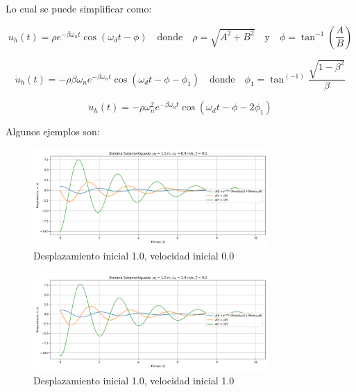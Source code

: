 \documentclass{article}  %
\begin{document}
Lo cual se puede simplificar como:

\begin{equation}
    u_h(t) = \rho e^{-\beta \omega_n t} \cos(\omega_d t - \phi) \quad \text{donde} \quad \rho = \sqrt{A^2 + B^2} \quad \text{y} \quad \phi = \tan^{-1}(\frac{A}{B})
\end{equation}

\begin{equation}
    \dot{u}_h(t) = -\rho \beta \omega_n e^{-\beta \omega_n t} \cos(\omega_d t - \phi -\phi_1) \quad \text{donde} \quad \phi_1 = \tan^(-1)\frac{\sqrt{1-\beta^2}}{\beta}
\end{equation}

\begin{equation}
    \ddot{u}_h(t) = -\rho \omega_n^2 e^{-\beta \omega_n t} \cos(\omega_d t - \phi - 2\phi_1)
\end{equation}

Algunos ejemplos son:

\begin{figure}[H]
    \centering
    \includegraphics[width=0.8\textwidth]{GRAFICOS/sis_subamortiguado_u0_1.0_v0_0.0_zeta_0.1.png}
    \caption{Desplazamiento inicial 1.0, velocidad inicial 0.0}
    \label{fig:ejemplo1}
\end{figure}

\begin{figure}[H]
    \centering
    \includegraphics[width=0.8\textwidth]{GRAFICOS/sis_subamortiguado_u0_1.0_v0_1.0_zeta_0.1.png}
    \caption{Desplazamiento inicial 1.0, velocidad inicial 1.0}
    \label{fig:ejemplo1}
\end{figure}
\end{document}
